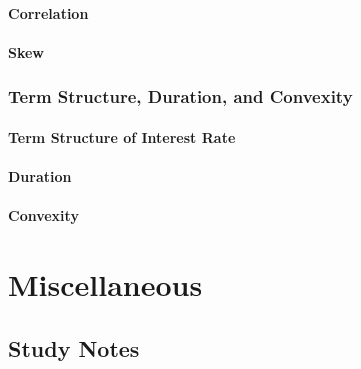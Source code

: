 \documentclass{book}
\begin{document}
\subsection{Correlation}
\subsection{Skew}

\section{Term Structure, Duration, and Convexity}
\subsection{Term Structure of Interest Rate}
\subsection{Duration}
\subsection{Convexity}

\part{Miscellaneous}
\chapter{Study Notes}
\end{document}

